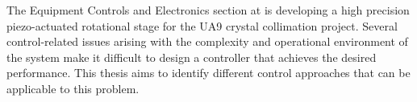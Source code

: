The Equipment Controls and Electronics section at \abbrCERN is developing a high precision piezo-actuated rotational stage for the UA9 crystal collimation project. Several control-related issues arising with the complexity and operational environment of the system make it difficult to design a controller that achieves the desired performance. This thesis aims to identify different control approaches that can be applicable to this problem.

